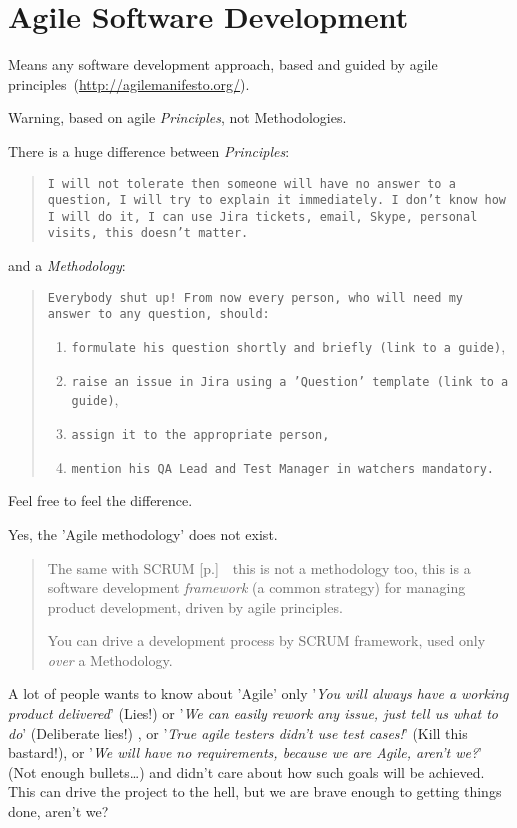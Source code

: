\section{Agile Software Development}
\label{sec:Agile Software Development}

Means any software development approach, based and guided by agile principles~(\url{http://agilemanifesto.org/}).

Warning, based on agile \emph{Principles}, not Methodologies. 

There is a huge difference between \emph{Principles}:
\begin{quote}
\texttt{I will not tolerate then someone will have no answer to a question, I will try to explain it immediately. I don't know how I will do it, I can use Jira tickets, email, Skype, personal visits, this doesn't matter.}
\end{quote} 
and a \emph{Methodology}:
\begin{quote}
\texttt{Everybody shut up! From now every person, who will need my answer to any question, should:}
\begin{enumerate}
\item \texttt{formulate his question shortly and briefly (link to a guide)},
\item \texttt{raise an issue in Jira using a 'Question' template (link to a guide)},
\item \texttt{assign it to the appropriate person,}
\item \texttt{mention his QA Lead and Test Manager in watchers mandatory.}
\end{enumerate}
\end{quote} 

Feel free to feel the difference.

Yes, the 'Agile methodology' does not exist.

\begin{quote}
The same with SCRUM [p.\pageref{sec:SCRUM}]~\textemdash~this is not a methodology too, this is a software development \emph{framework} (a common strategy) for managing product development, driven by agile principles. 

You can drive a development process by SCRUM framework, used only \emph{over} a Methodology.
\end{quote} 

A lot of people wants to know about 'Agile' only '\textit{You will always have a working product delivered}' (Lies!) or '\textit{We can easily rework any issue, just tell us what to do}' (Deliberate lies!) , or '\textit{True agile testers didn't use test cases!}' (Kill this bastard!), or '\textit{We will have no requirements, because we are Agile, aren't we?}' (Not enough bullets\ldots) and didn't care about how such goals will be achieved. This can drive the project to the hell, but we are brave enough to getting things done, aren't we?
